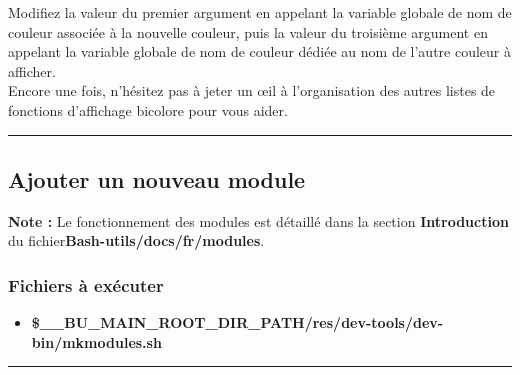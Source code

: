 \documentclass[a4paper,10pt]{article}
\begin{document}
Modifiez la valeur du premier argument en appelant la variable globale de nom de couleur associée à la nouvelle couleur, puis la valeur du troisième argument en appelant la variable globale de nom de couleur dédiée au nom de l'autre couleur à afficher.\\[1\baselineskip]

Encore une fois, n'hésitez pas à jeter un œil à l'organisation des autres listes de fonctions d'affichage bicolore pour vous aider.\\[1\baselineskip]



\color{green}\par\noindent\rule{\textwidth}{0.4pt}\color{white}

\color{green}
\subsection{Ajouter un nouveau module}\color{white}

\textbf{Note :} Le fonctionnement des modules est détaillé dans la section \textbf{\color{red}Introduction} du fichier\linebreak \textbf{\color{lime}Bash-utils/docs/fr/modules}.

\color{blue}
\subsubsection{Fichiers à exécuter}\color{white}
\begin{itemize}
    \item \textbf{\color{orange}\$\_\_BU\_MAIN\_ROOT\_DIR\_PATH\color{lime}/res/dev-tools/dev-bin/mkmodules.sh}
\end{itemize}



\color{blue}\par\noindent\rule{\textwidth}{0.4pt}\color{white}

\color{blue}
\end{document}
